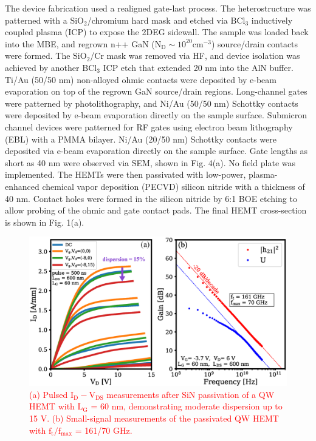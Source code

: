 \documentclass[journal]{IEEEtran}
\begin{document}
The device fabrication used a realigned gate-last process. The heterostructure was patterned with a $\mathrm{SiO_2}$/chromium hard mask and etched via $\mathrm{BCl_3}$ inductively coupled plasma (ICP) to expose the 2DEG sidewall. The sample was loaded back into the MBE, and regrown n++ GaN ($\mathrm{N_D}\sim10^{20} \mathrm{cm^{-3}}$) source/drain contacts were formed. The $\mathrm{SiO_2}$/Cr mask was removed via HF, and device isolation was achieved by another $\mathrm{BCl_3}$ ICP etch that extended 20 nm into the AlN buffer. Ti/Au (50/50 nm) non-alloyed ohmic contacts were deposited by e-beam evaporation on top of the regrown GaN source/drain regions. Long-channel gates were patterned by photolithography, and Ni/Au (50/50 nm) Schottky contacts were deposited by e-beam evaporation directly on the sample surface. Submicron channel devices were patterned for RF gates using electron beam lithography (EBL) with a PMMA bilayer. Ni/Au (20/50 nm) Schottky contacts were deposited via e-beam evaporation directly on the sample surface. Gate lengths as short as 40 nm were observed via SEM, shown in Fig. 4(a). No field plate was implemented. The HEMTs were then passivated with low-power, plasma-enhanced chemical vapor deposition (PECVD) silicon nitride with a thickness of 40 nm. Contact holes were formed in the silicon nitride by 6:1 BOE etching to allow probing of the ohmic and gate contact pads. The final HEMT cross-section is shown in Fig. 1(a).

\begin{figure}[!b]
\centering
\includegraphics[width=\columnwidth]{Figure3_withsmallsignal.eps}
\caption{\textcolor{red}{(a) Pulsed $\mathrm{I_D-V_{DS}}$ measurements after SiN passivation of a QW HEMT with $\mathrm{L_G}$ = 60 nm, demonstrating moderate dispersion up to 15 V. (b) Small-signal measurements of the passivated QW HEMT with $\mathrm{f_t/f_{max}}$ = 161/70 GHz.}}
\label{fig:pulsed}
\end{figure}
\end{document}
